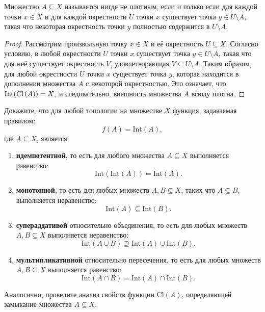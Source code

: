 \begin{theorem}
	Множество \( A \subseteq X \) называется нигде не плотным, если и только если для каждой точки \( x \in X \) и для каждой окрестности \( U \) точки \( x \) существует точка \( y \in U \setminus A \), такая что некоторая окрестность точки \( y \) полностью содержится в \( U \setminus A \).
\end{theorem}
\begin{proof}
	Рассмотрим произвольную точку \( x \in X \) и её окрестность \( U \subseteq X \). Согласно условию, в любой окрестности \( U \) точки \( x \) существует точка \( y \in U \setminus A \), такая что для неё существует окрестность \( V \), удовлетворяющая \( V \subseteq U \setminus A \). Таким образом, для любой окрестности \( U \) точки \( x \) существует точка \( y \), которая находится в дополнении множества \( A \) с некоторой окрестностью. Это означает, что \( \text{Int}(\mathrm{Cl}\left(A\right)) = X \), и следовательно, внешность множества \( A \) всюду плотна.
\end{proof}

\bigskip
{}

\begin{task}
	Докажите, что для любой топологии на множестве \( X \) функция, задаваемая правилом: 
\[
f(A) = \text{Int}(A),
\]  
где \( A \subseteq X \), является:

\begin{enumerate}
	\item \textbf{идемпотентной}, то есть для любого множества \( A \subseteq X \) выполняется равенство:  
	\[
	\text{Int}(\text{Int}(A)) = \text{Int}(A).
	\]	
	\item \textbf{монотонной}, то есть для любых множеств \( A, B \subseteq X \), таких что \( A \subseteq B \), выполняется неравенство:  
	\[
	\text{Int}(A) \subseteq \text{Int}(B).
	\]	
	\item \textbf{супераддативой} относительно объединения, то есть для любых множеств \( A, B \subseteq X \) выполняется неравенство:  
	\[
	\text{Int}(A \cup B) \supseteq \text{Int}(A) \cup \text{Int}(B).
	\]  
	\item \textbf{мультипликативной} относительно пересечения, то есть для любых множеств \( A, B \subseteq X \) выполняется равенство:  
	\[
	\text{Int}(A \cap B) = \text{Int}(A) \cap \text{Int}(B).
	\]
\end{enumerate}
\end{task}
\begin{task}
	Аналогично, проведите анализ свойств функции \( \text{Cl}(A) \), определяющей замыкание множества \( A \subseteq X \). 
\end{task}



